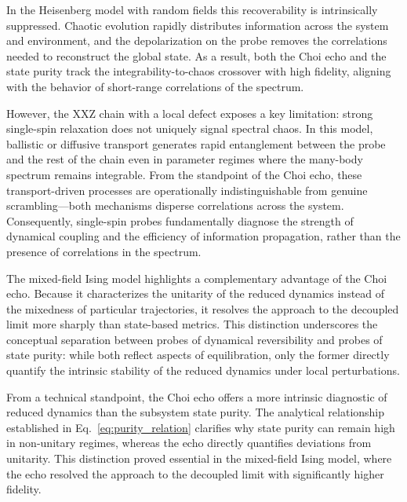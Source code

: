 \documentclass[pra,twocolumn,aps,showpacs,superscriptaddress,longbibliography]{revtex4-2}%
\begin{document}
In the Heisenberg model with random fields this recoverability is intrinsically suppressed. Chaotic evolution rapidly distributes information across the system and environment, and the depolarization on the probe removes the correlations needed to reconstruct the global state. As a result, both the Choi echo and the state purity track the integrability-to-chaos crossover with high fidelity, aligning with the behavior of short-range correlations of the spectrum.

However, the XXZ chain with a local defect exposes a key limitation: strong single-spin relaxation does not uniquely signal spectral chaos. In this model, ballistic or diffusive transport generates rapid entanglement between the probe and the rest of the chain even in parameter regimes where the many-body spectrum remains integrable. From the standpoint of the Choi echo, these transport-driven processes are operationally indistinguishable from genuine scrambling—both mechanisms disperse correlations across the system. Consequently, single-spin probes fundamentally diagnose the strength of dynamical coupling and the efficiency of information propagation, rather than the presence of correlations in the spectrum.

The mixed-field Ising model highlights a complementary advantage of the Choi echo. Because it characterizes the unitarity of the reduced dynamics instead of the mixedness of particular trajectories, it resolves the approach to the decoupled limit more sharply than state-based metrics. This distinction underscores the conceptual separation between probes of dynamical reversibility and probes of state purity: while both reflect aspects of equilibration, only the former directly quantify the intrinsic stability of the reduced dynamics under local perturbations.

From a technical standpoint, the Choi echo offers a more intrinsic diagnostic of reduced dynamics than the subsystem state purity. The analytical relationship established in Eq.~\eqref{eq:purity_relation} clarifies why state purity can remain high in non-unitary regimes, whereas the echo directly quantifies deviations from unitarity. This distinction proved essential in the mixed-field Ising model, where the echo resolved the approach to the decoupled limit with significantly higher fidelity.
\end{document}
